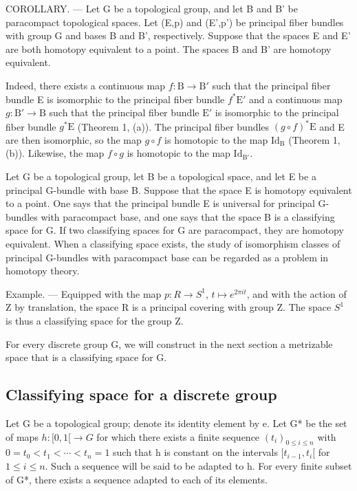COROLLARY. --- Let G be a topological group, and let B and B' be paracompact topological spaces. Let (E,p) and (E',p') be principal fiber bundles with group G and bases B and B', respectively. Suppose that the spaces E and E' are both homotopy equivalent to a point. The spaces B and B' are homotopy equivalent.

Indeed, there exists a continuous map \(f \colon \mathrm{B} \to \mathrm{B}'\) such that the principal fiber bundle E is isomorphic to the principal fiber bundle \(f^* \mathrm{E}'\) and a continuous map \(g \colon \mathrm{B}' \to \mathrm{B}\) such that the principal fiber bundle \(\mathrm{E}'\) is isomorphic to the principal fiber bundle \(g^* \mathrm{E}\) (Theorem 1, (a)). The principal fiber bundles \((g \circ f)^* \mathrm{E}\) and E are then isomorphic, so the map \(g \circ f\) is homotopic to the map \(\mathrm{Id}_{\mathrm{B}}\) (Theorem 1, (b)). Likewise, the map \(f \circ g\) is homotopic to the map \(\mathrm{Id}_{\mathrm{B}'}\).

Let G be a topological group, let B be a topological space, and let E be a principal G-bundle with base B. Suppose that the space E is homotopy equivalent to a point. One says that the principal bundle E is universal for principal G-bundles with paracompact base, and one says that the space B is a classifying space for G. If two classifying spaces for G are paracompact, they are homotopy equivalent. When a classifying space exists, the study of isomorphism classes of principal G-bundles with paracompact base can be regarded as a problem in homotopy theory.

Example. --- Equipped with the map \(p: R \to S^{1}\), \(t \mapsto e^{2\pi it}\), and with the action of Z by translation, the space R is a principal covering with group Z. The space \(S^{1}\) is thus a classifying space for the group Z.

For every discrete group G, we will construct in the next section a metrizable space that is a classifying space for G.

\subsection{Classifying space for a discrete group}

Let G be a topological group; denote its identity element by e. Let G* be the set of maps \(h\colon[0,1[ \to G\) for which there exists a finite sequence \((t_{i})_{0\leqslant i\leqslant n}\) with \(0=t_{0}<t_{1}<\cdots<t_{n}=1\) such that h is constant on the intervals \([t_{i-1},t_{i}[\) for \(1\leqslant i\leqslant n\). Such a sequence will be said to be adapted to h. For every finite subset of G*, there exists a sequence adapted to each of its elements.

